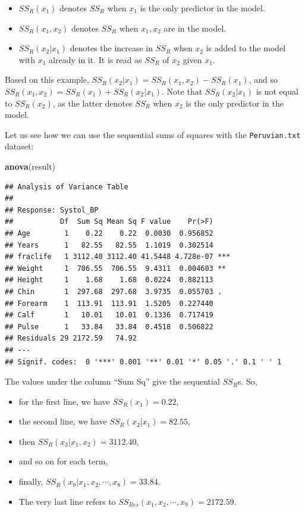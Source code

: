 \documentclass[
]{book}
\newenvironment{Shaded}{\begin{snugshade}}{\end{snugshade}}
\newcommand{\FunctionTok}[1]{\textcolor[rgb]{0.13,0.29,0.53}{\textbf{#1}}}
\newcommand{\NormalTok}[1]{#1}
\providecommand{\tightlist}{%
  \setlength{\itemsep}{0pt}\setlength{\parskip}{0pt}}
\begin{document}
\begin{itemize}
\tightlist
\item
  \(SS_R(x_1)\) denotes \(SS_R\) when \(x_1\) is the only predictor in the model.
\item
  \(SS_R(x_1, x_2)\) denotes \(SS_R\) when \(x_1, x_2\) are in the model.
\item
  \(SS_R(x_2|x_1)\) denotes the increase in \(SS_R\) when \(x_2\) is added to the model with \(x_1\) already in it. It is read as \(SS_R\) of \(x_2\) given \(x_1\).
\end{itemize}

Based on this example, \(SS_R(x_2|x_1) = SS_R(x_1, x_2) - SS_R(x_1)\), and so \(SS_R(x_1, x_2) = SS_R(x_1) + SS_R(x_2|x_1)\). Note that \(SS_R(x_2|x_1)\) is not equal to \(SS_R(x_2)\), as the latter denotes \(SS_R\) when \(x_2\) is the only predictor in the model.

Let us see how we can use the sequential sums of squares with the \texttt{Peruvian.txt} dataset:

\begin{Shaded}
\begin{Highlighting}[]
\FunctionTok{anova}\NormalTok{(result)}
\end{Highlighting}
\end{Shaded}

\begin{verbatim}
## Analysis of Variance Table
## 
## Response: Systol_BP
##           Df  Sum Sq Mean Sq F value    Pr(>F)    
## Age        1    0.22    0.22  0.0030  0.956852    
## Years      1   82.55   82.55  1.1019  0.302514    
## fraclife   1 3112.40 3112.40 41.5448 4.728e-07 ***
## Weight     1  706.55  706.55  9.4311  0.004603 ** 
## Height     1    1.68    1.68  0.0224  0.882113    
## Chin       1  297.68  297.68  3.9735  0.055703 .  
## Forearm    1  113.91  113.91  1.5205  0.227440    
## Calf       1   10.01   10.01  0.1336  0.717419    
## Pulse      1   33.84   33.84  0.4518  0.506822    
## Residuals 29 2172.59   74.92                      
## ---
## Signif. codes:  0 '***' 0.001 '**' 0.01 '*' 0.05 '.' 0.1 ' ' 1
\end{verbatim}

The values under the column ``Sum Sq'' give the sequential \(SS_{R}\)s. So,

\begin{itemize}
\tightlist
\item
  for the first line, we have \(SS_{R}(x_1) = 0.22\),
\item
  the second line, we have \(SS_{R}(x_2|x_1) = 82.55\),
\item
  then \(SS_{R}(x_3|x_1, x_2) = 3112.40\),
\item
  and so on for each term,
\item
  finally, \(SS_{R}(x_9|x_1, x_2, \cdots, x_8) = 33.84\).
\item
  The very last line refers to \(SS_{Res}(x_1, x_2, \cdots, x_9) = 2172.59\).
\end{itemize}
\end{document}
